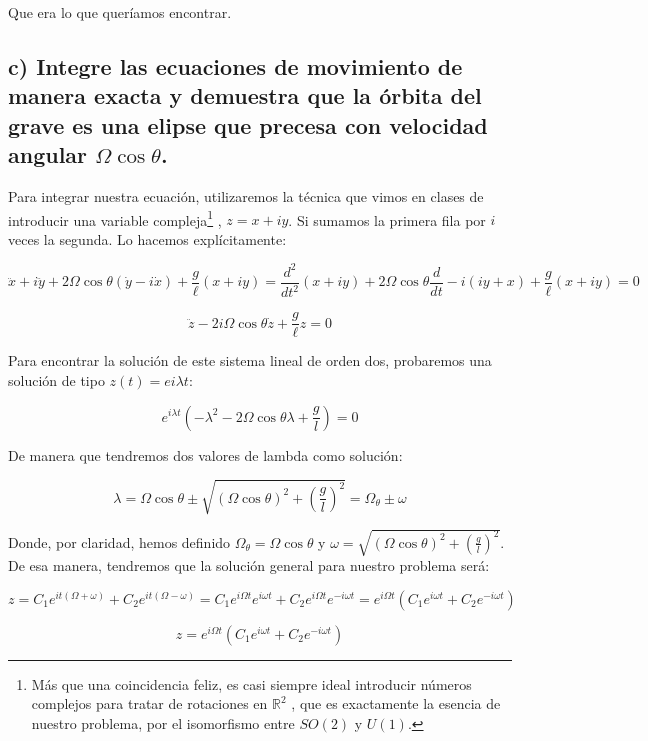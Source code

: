 \documentclass[a4paper,12pt]{article}
\begin{document}
Que era lo que queríamos encontrar.

\subsection*{c) Integre las ecuaciones de movimiento de manera exacta y demuestra que la órbita del grave es una elipse que precesa con velocidad angular $\Omega \cos\theta$.}

Para integrar nuestra ecuación, utilizaremos la técnica que vimos en clases de introducir una variable  compleja\footnote{Más que una coincidencia feliz, es casi siempre ideal introducir números complejos para tratar de rotaciones en $\mathbb{R}^{2}$ , que es exactamente la esencia de nuestro problema, por el isomorfismo entre $SO(2)$ y $U(1)$.} , $z = x + i y $. Si sumamos la primera fila por $i$ veces la segunda. Lo hacemos explícitamente:

$$\ddot{x} + i\ddot{y} + 2\Omega \cos\theta(\dot{y} -i \dot{x}) + \frac{g}{\ell} (x + i y) =\frac{d^2}{dt^2} \left(x + i y\right) + 2\Omega \cos\theta\frac{d}{dt}-i (iy + x) + \frac{g}{\ell} (x + i y) = 0 $$

$$\ddot{z} - 2i\Omega\cos\theta \dot{z} + \frac{g}{\ell} z = 0$$

Para encontrar la solución de este sistema lineal de orden dos, probaremos una solución de tipo $z(t) = e{i\lambda t}$:

$$e^{i\lambda t} (-\lambda^2 - 2\Omega \cos{\theta} \lambda + \frac{g}{l}) = 0$$

De manera que tendremos dos valores de lambda como solución:

$$\lambda = \Omega \cos\theta \pm \sqrt{(\Omega\cos\theta)^2 + \left(\frac{g}{l}\right)^2} = \Omega_\theta \pm \omega$$

Donde, por claridad, hemos definido $\Omega_\theta = \Omega \cos\theta$ y $\omega = \sqrt{(\Omega\cos\theta)^2 + \left(\frac{g}{l}\right)^2}$. De esa manera, tendremos que la solución general para nuestro problema será:

$$z = C_1 e^{it(\Omega + \omega)} +C_2 e^{it(\Omega - \omega)} = C_1 e^{i\Omega t} e^{i\omega t} + C_2 e^{i \Omega t} e^{-i\omega t} = e^{i\Omega t}\left(C_1 e^{i\omega t} + C_2 e^{-i\omega t}\right) $$

\begin{equation}
  \label{sol1}
  z = e^{i\Omega t}\left(C_1 e^{i\omega t} + C_2 e^{-i\omega t}\right) 
\end{equation}
\end{document}
